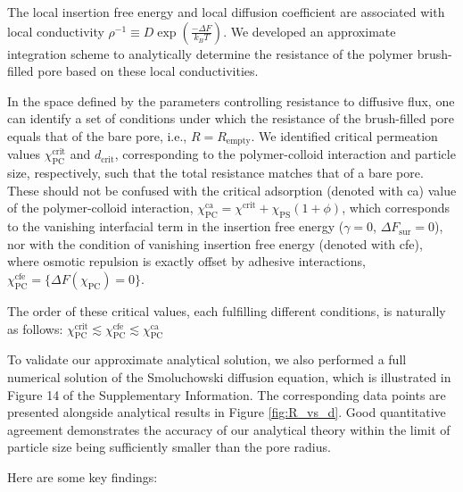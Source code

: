 \documentclass[12pt, a4paper]{article}
\begin{document}
The local insertion free energy and local diffusion coefficient are associated with local conductivity $\rho^{-1}\equiv D \exp\left(\frac{-\Delta F}{k_B T}\right)$.
We developed an approximate integration scheme to analytically determine the resistance of the polymer brush-filled pore based on these local conductivities.

In the space defined by the parameters controlling resistance to diffusive flux, one can identify a set of conditions under which the resistance of the brush-filled pore equals that of the bare pore, i.e., $R = R_{\text{empty}}$.
We identified critical permeation values $\chi^{\text{crit}}_{\text{PC}}$ and $d_{\text{crit}}$, corresponding to the polymer-colloid interaction and particle size, respectively, such that the total resistance matches that of a bare pore.
These should not be confused with the critical adsorption (denoted with ca) value of the polymer-colloid interaction, $\chi^{\text{ca}}_{\text{PC}} = \chi^{\text{crit}} + \chi_{\text{PS}}(1 + \phi)$, which corresponds to the vanishing interfacial term in the insertion free energy ($\gamma = 0$, $\Delta F_{\text{sur}} = 0$), nor with the condition of vanishing insertion free energy (denoted with cfe), where osmotic repulsion is exactly offset by adhesive interactions, $\chi^{\text{cfe}}_{\text{PC}} = \{\Delta F (\chi_{\text{PC}}) = 0\}$.

The order of these critical values, each fulfilling different conditions, is naturally as follows:
$\chi^{\text{crit}}_{\text{PC}} \lesssim \chi^{\text{cfe}}_{\text{PC}} \lesssim \chi^{\text{ca}}_{\text{PC}}$
 
To validate our approximate analytical solution, we also performed a full numerical solution of the Smoluchowski diffusion equation, which is illustrated in 
Figure 14 of the Supplementary Information.
The corresponding data points are presented alongside analytical results in Figure \ref{fig:R_vs_d}.
Good quantitative agreement demonstrates the accuracy of our analytical theory within the limit of particle size being sufficiently smaller than the pore radius.

Here are some key findings:
\end{document}
